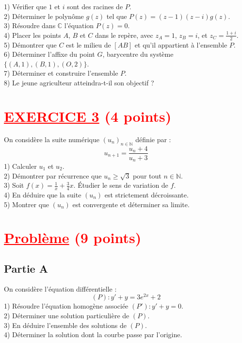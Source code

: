 \documentclass[12pt]{article}
\begin{document}
1) Vérifier que \(1\) et \(i\) sont des racines de \(P\). \\
2) Déterminer le polynôme \( g(z) \) tel que \( P(z) = (z-1)(z-i)g(z) \). \\
3) Résoudre dans \( \mathbb{C} \) l'équation \( P(z) = 0 \). \\
4) Placer les points \( A \), \( B \) et \( C \) dans le repère, avec \( z_A = 1 \), \( z_B = i \), et \( z_C = \frac{1+i}{2} \). \\
5) Démontrer que \( C \) est le milieu de \( [AB] \) et qu'il appartient à l'ensemble \( P \). \\
6) Déterminer l'affixe du point \( G \), barycentre du système \( \{(A,1), (B,1), (O,2)\} \). \\
7) Déterminer et construire l'ensemble \( P \). \\
8) Le jeune agriculteur atteindra-t-il son objectif ?

\section*{\textcolor{red}{\underline{EXERCICE 3} (4 points) }}
On considère la suite numérique \( (u_n)_{n \in \mathbb{N}} \) définie par :
\[
u_{n+1} = \frac{u_n + 4}{u_n + 3}
\]
1) Calculer \( u_1 \) et \( u_2 \). \\
2) Démontrer par récurrence que \( u_n \geq \sqrt{3} \) pour tout \( n \in \mathbb{N} \). \\
3) Soit \( f(x) = \frac{1}{x} + \frac{3}{4}x \). Étudier le sens de variation de \( f \). \\
4) En déduire que la suite \( (u_n) \) est strictement décroissante. \\
5) Montrer que \( (u_n) \) est convergente et déterminer sa limite.

\section*{\textcolor{red}{\underline{Problème} (9 points) }}
\subsection*{Partie A}
On considère l'équation différentielle :
\[
(P) : y' + y = 3e^{2x} + 2
\]
1) Résoudre l'équation homogène associée \( (P') : y' + y = 0 \). \\
2) Déterminer une solution particulière de \( (P) \). \\
3) En déduire l'ensemble des solutions de \( (P) \). \\
4) Déterminer la solution dont la courbe passe par l'origine.
\end{document}
